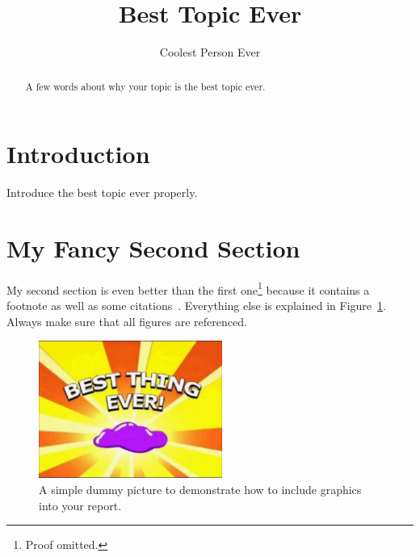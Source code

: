 \documentclass{ACGSeminar}
\begin{document}
\title{Best Topic Ever}

\author{Coolest Person Ever}

\maketitle


\begin{abstract}%
A few words about why your topic is the best topic ever.
\end{abstract}

\tableofcontents

\newpage

\label{cha:introduction}
\section{Introduction}
Introduce the best topic ever properly.

\section{My Fancy Second Section}
My second section is even better than the first one\footnote{Proof omitted.} because it contains a footnote as well as some citations~\cite{Squarepants03,Knuth97}.
Everything else is explained in Figure~\ref{fig:dummy}. Always make sure that all figures are referenced.

\begin{figure}[htb!]
  \begin{centering}
    \includegraphics[width=6cm]{img/thing.jpg}\par
  \end{centering}
  \caption{A simple dummy picture to demonstrate how to include graphics into your report.}
  \label{fig:dummy}
\end{figure}

\label{cha:references}
\printbibliography
\end{document}
